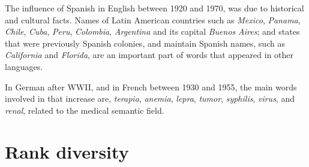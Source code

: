 \documentclass[10pt,letterpaper]{article} %
\begin{document}
The influence of Spanish in English between 1920 and 1970, was due to
historical and cultural facts. Names of Latin American  countries such as
\textit{Mexico}, \textit{Panama}, \textit{Chile}, \textit{Cuba}, \textit{Peru},
\textit{Colombia}, \textit{Argentina} and its capital \textit{Buenos}
\textit{Aires};  and states that were previously Spanish colonies, and maintain Spanish names, such as \textit{California} and
\textit{Florida}, are an important part of words that appeared in 
other languages. 

In German after WWII, and in French between 1930 and 1955, the main words
involved in that increase are, \textit{terapia}, \textit{anemia},
\textit{lepra}, \textit{tumor}, \textit{syphilis}, \textit{virus}, and
\textit{renal}, related to the medical semantic field. 



\section*{Rank diversity} %
\end{document}
